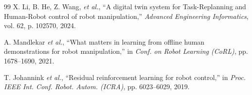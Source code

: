 \documentclass[journal,twocolumn]{IEEEtran}
\begin{document}
\begin{thebibliography}{99}
X. Li, B. He, Z. Wang, \textit{et al.}, ``A digital twin system for Task-Replanning and Human-Robot control of robot manipulation,'' \textit{Advanced Engineering Informatics}, vol. 62, p. 102570, 2024.

A. Mandlekar \textit{et al.}, ``What matters in learning from offline human demonstrations for robot manipulation,'' in \textit{Conf. on Robot Learning (CoRL)}, pp. 1678--1690, 2021.

T. Johannink \textit{et al.}, ``Residual reinforcement learning for robot control,'' in \textit{Proc. IEEE Int. Conf. Robot. Autom. (ICRA)}, pp. 6023--6029, 2019.

\end{thebibliography}
\end{document}
